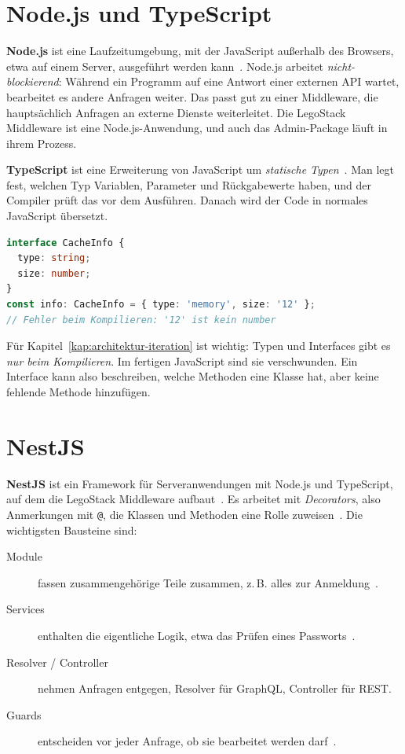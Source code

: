 \section{Node.js und TypeScript}
\label{sec:node}
\label{sec:typescript}

\textbf{Node.js} ist eine Laufzeitumgebung, mit der JavaScript außerhalb des Browsers, etwa auf einem Server, ausgeführt werden kann~\cite{nodejs}. Node.js arbeitet \emph{nicht-blockierend}: Während ein Programm auf eine Antwort einer externen API wartet, bearbeitet es andere Anfragen weiter. Das passt gut zu einer Middleware, die hauptsächlich Anfragen an externe Dienste weiterleitet. Die LegoStack Middleware ist eine Node.js-Anwendung, und auch das Admin-Package läuft in ihrem Prozess.

\textbf{TypeScript} ist eine Erweiterung von JavaScript um \emph{statische Typen}~\cite{typescript}. Man legt fest, welchen Typ Variablen, Parameter und Rückgabewerte haben, und der Compiler prüft das vor dem Ausführen. Danach wird der Code in normales JavaScript übersetzt.

\begin{lstlisting}[language=TypeScript, caption={Typen in TypeScript}, label={lst:ts-typen}]
interface CacheInfo {
  type: string;
  size: number;
}
const info: CacheInfo = { type: 'memory', size: '12' };
// Fehler beim Kompilieren: '12' ist kein number
\end{lstlisting}

Für Kapitel~\ref{kap:architektur-iteration} ist wichtig: Typen und Interfaces gibt es \emph{nur beim Kompilieren}. Im fertigen JavaScript sind sie verschwunden. Ein Interface kann also beschreiben, welche Methoden eine Klasse hat, aber keine fehlende Methode hinzufügen.

\section{NestJS}
\label{sec:nestjs}

\textbf{NestJS} ist ein Framework für Serveranwendungen mit Node.js und TypeScript, auf dem die LegoStack Middleware aufbaut~\cite{nestjs}. Es arbeitet mit \emph{Decorators}, also Anmerkungen mit \texttt{@}, die Klassen und Methoden eine Rolle zuweisen~\cite{ts-decorators}. Die wichtigsten Bausteine sind:

\begin{description}
  \item[Module] fassen zusammengehörige Teile zusammen, z.\,B. alles zur Anmeldung~\cite{nestjs-modules}.
  \item[Services] enthalten die eigentliche Logik, etwa das Prüfen eines Passworts~\cite{nestjs-providers}.
  \item[Resolver / Controller] nehmen Anfragen entgegen, Resolver für GraphQL, Controller für REST.
  \item[Guards] entscheiden vor jeder Anfrage, ob sie bearbeitet werden darf~\cite{nestjs-guards}.
\end{description}

